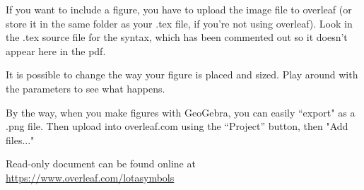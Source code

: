 \documentclass[12pt]{article}
\begin{document}
\noindent If you want to include a figure, you have to upload the image file to overleaf (or store it in the same folder as your .tex file, if you're not using overleaf).  Look in the .tex source file for the syntax, which has been commented out so it doesn't appear here in the pdf. 


It is possible to change the way your figure is placed and sized. Play around with the parameters to see what happens.

By the way, when you make figures with GeoGebra, you can easily ``export" as a .png file. Then upload into overleaf.com using the ``Project'' button, then "Add files..." 
  

\vfill
\small{Read-only document can be found online at \url{https://www.overleaf.com/lotasymbols}} %
 

 
\end{document}
